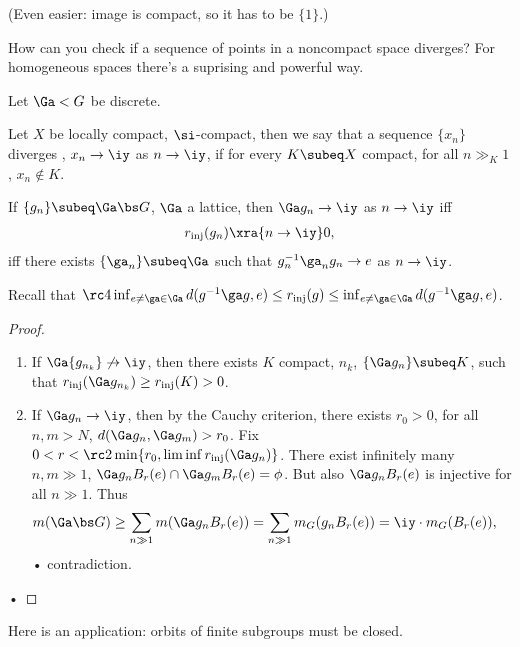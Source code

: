 (Even easier: image is compact, so it has to be $\{1\}$.) %

How can you check if a sequence of points in a noncompact space diverges? For homogeneous spaces there's a suprising and powerful way.

Let $\Ga<G$ be discrete. 
\begin{df}
Let $X$ be locally compact, $\si$-compact, then we say that a sequence $\{x_n\}$ diverges , $x_n\to \iy$ as $n\to \iy$, if for every $K\subeq X$ compact, for all $n\gg_K1$, $x_n\nin K$. 
\end{df}

\begin{pr}
If $\{g_n\}\subeq \Ga \bs G$, $\Ga$ a lattice,  then $\Ga g_n\to \iy$ as $n\to \iy$ iff
\begin{align}
r_{\text{inj}}(g_n)\xra{n\to \iy} 0,
\end{align}
iff there exists $\{\ga_n\}\subeq \Ga$ %
such that 
$g_n^{-1}\ga_ng_n\to e$ as $n\to \iy$.
\end{pr} 
Recall that $\rc 4 \inf_{e\ne \ga\in \Ga}d(g^{-1}\ga g,e) \le r_{\text{inj}}(g) \le \inf_{e\ne \ga\in \Ga}d(g^{-1}\ga g,e)$.
\begin{proof}
\begin{enumerate}
\item
If $\Ga{g_{n_k}}\not\to\iy$, then there exists $K$ compact, $n_k$, $\{\Ga g_n\}\subeq K$, such that $r_{\text{inj}}(\Ga g_{n_k})\ge r_{\text{inj}}(K)>0$. 
\item
If $\Ga g_n\to \iy$, then by the Cauchy criterion, there exists $r_0>0$, for all $n,m>N$, $d(\Ga g_n,\Ga g_m)>r_0$.  
Fix $0<r<\rc 2 \min\{r_0, \liminf r_{\text{inj}}(\Ga g_n)\}$. 
There exist infinitely many $n,m\gg1$, $\Ga g_nB_r(e) \cap \Ga g_mB_r(e)=\phi$. But also $\Ga g_n B_r(e)$ is injective for all $n\gg 1$. 
Thus 
\begin{align}
m(\Ga\bs G) & \ge \sum_{n\gg 1} m(\Ga g_nB_r(e)) = \sum_{n\gg 1} m_G(g_nB_r(e)) = \iy \cdot m_G(B_r(e)),
\end{align}•
contradiction.
\end{enumerate}•
\end{proof}

Here is an application: orbits of finite subgroups must be closed.

